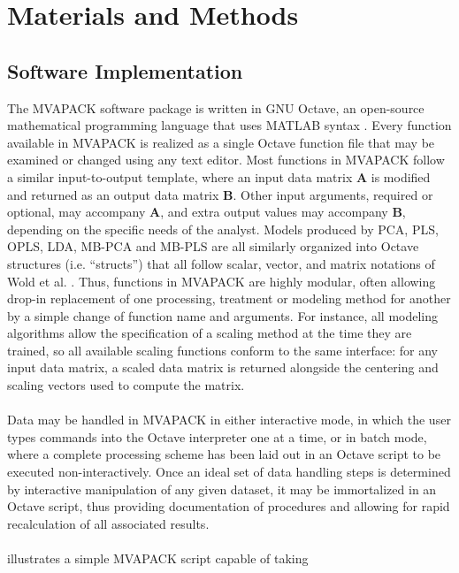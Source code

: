 \section{Materials and Methods}

\subsection{Software Implementation}

\begin{doublespace}
The MVAPACK software package is written in GNU Octave, an open-source
mathematical programming language that uses MATLAB syntax \cite{eaton2008}.
Every function available in MVAPACK is realized as a single Octave function
file that may be examined or changed using any text editor. Most functions in
MVAPACK follow a similar input-to-output template, where an input data matrix
$\mathbf{A}$ is modified and returned as an output data matrix $\mathbf{B}$.
Other input arguments, required or optional, may accompany $\mathbf{A}$, and
extra output values may accompany $\mathbf{B}$, depending on the specific
needs of the analyst. Models produced by PCA, PLS, OPLS, LDA, MB-PCA and
MB-PLS are all similarly organized into Octave structures (i.e. ``structs'')
that all follow scalar, vector, and matrix notations of Wold et al.
\cite{wold:cils2001}. Thus, functions in MVAPACK are highly modular, often
allowing drop-in replacement of one processing, treatment or modeling method
for another by a simple change of function name and arguments. For instance,
all modeling algorithms allow the specification of a scaling method at the
time they are trained, so all available scaling functions conform to the
same interface: for any input data matrix, a scaled data matrix is returned
alongside the centering and scaling vectors used to compute the matrix.
\\\\
Data may be handled in MVAPACK in either interactive mode, in which the user
types commands into the Octave interpreter one at a time, or in batch mode,
where a complete processing scheme has been laid out in an Octave script to
be executed non-interactively. Once an ideal set of data handling steps is
determined by interactive manipulation of any given dataset, it may be
immortalized in an Octave script, thus providing documentation of procedures
and allowing for rapid recalculation of all associated results.
\\\\
 illustrates a simple MVAPACK script capable of taking

\end{doublespace}
